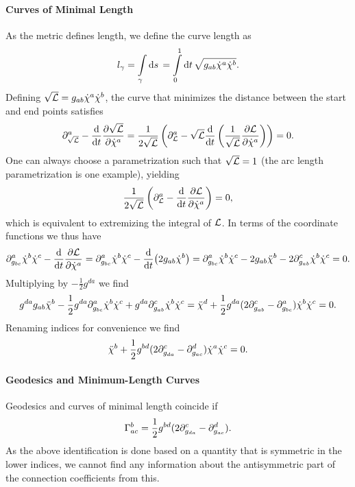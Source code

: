 \paragraph{Curves of Minimal Length}
As the metric defines length, we define the curve length as
\begin{align*}
	l_{\gamma} = \int\limits_{\gamma}^{}\dd{s}{} = \int\limits_{0}^{1}\dd{t}{\sqrt{g_{ab}\dot{\chi}^{a}\dot{\chi}^{b}}}.
\end{align*}
Defining $\sqrt{\mathcal{L}} = g_{ab}\dot{\chi}^{a}\dot{\chi}^{b}$, the curve that minimizes the distance between the start and end points satisfies
\begin{align*}
	\partial^{a}_{\sqrt{\mathcal{L}}} - \dv{t}\pdv{\sqrt{\ensuremath{\mathcal{L}}}}{\dot{\chi}^{a}} = \frac{1}{2\sqrt{\mathcal{L}}}\left(\partial^{a}_{\mathcal{L}} - \sqrt{\mathcal{L}}\dv{t}\left(\frac{1}{\sqrt{\mathcal{L}}}\pdv{\ensuremath{\mathcal{L}}}{\dot{\chi}^{a}}\right)\right) = 0.
\end{align*}
One can always choose a parametrization such that $\sqrt{\mathcal{L}} = 1$ (the arc length parametrization is one example), yielding
\begin{align*}
	\frac{1}{2\sqrt{\mathcal{L}}}\left(\partial^{a}_{\mathcal{L}} - \dv{t}\pdv{\ensuremath{\mathcal{L}}}{\dot{\chi}^{a}}\right) = 0,
\end{align*}
which is equivalent to extremizing the integral of $\mathcal{L}$. In terms of the coordinate functions we thus have
\begin{align*}
	\partial^{a}_{g_{bc}}\dot{\chi}^{b}\dot{\chi}^{c} - \dv{t}\pdv{\ensuremath{\mathcal{L}}}{\dot{\chi}^{a}} = \partial^{a}_{g_{bc}}\dot{\chi}^{b}\dot{\chi}^{c} - \dv{t}(2g_{ab}\dot{\chi}^{b}) = \partial^{a}_{g_{bc}}\dot{\chi}^{b}\dot{\chi}^{c} - 2g_{ab}\ddot{\chi}^{b} - 2\partial^{c}_{g_{ab}}\dot{\chi}^{b}\dot{\chi}^{c} = 0.
\end{align*}
Multiplying by $-\frac{1}{2}g^{da}$ we find
\begin{align*}
	g^{da}g_{ab}\ddot{\chi}^{b} - \frac{1}{2}g^{da}\partial^{a}_{g_{bc}}\dot{\chi}^{b}\dot{\chi}^{c} + g^{da}\partial^{c}_{g_{ab}}\dot{\chi}^{b}\dot{\chi}^{c} = \ddot{\chi}^{d} + \frac{1}{2}g^{da}(2\partial^{c}_{g_{ab}} - \partial^{a}_{g_{bc}})\dot{\chi}^{b}\dot{\chi}^{c} = 0.
\end{align*}
Renaming indices for convenience we find
\begin{align*}
	\ddot{\chi}^{b} + \frac{1}{2}g^{bd}(2\partial^{c}_{g_{da}} - \partial^{d}_{g_{ac}})\dot{\chi}^{a}\dot{\chi}^{c} = 0.
\end{align*}

\paragraph{Geodesics and Minimum-Length Curves}
Geodesics and curves of minimal length coincide if
\begin{align*}
	\chris{b}{a}{c} = \frac{1}{2}g^{bd}(2\del{c}{g_{da}} - \del{d}{g_{ac}}).
\end{align*}
As the above identification is done based on a quantity that is symmetric in the lower indices, we cannot find any information about the antisymmetric part of the connection coefficients from this.


